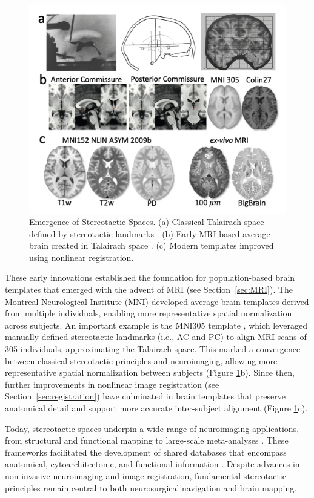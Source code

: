 \begin{figure}[hbt!]
    \centering
    \includegraphics[width=0.85\linewidth]{figs/ch1_Figure_templates.png}
    \caption{Emergence of Stereotactic Spaces. (a) Classical Talairach space defined by stereotactic landmarks \cite{Talairach1957-eb}. (b) Early MRI-based average brain created in Talairach space \cite{Collins1994-dx}. (c) Modern templates \cite{Fonov2011-ck,Edlow2020-mo, Amunts2013-vu} improved using nonlinear registration.}
    \label{fig:ch1_Figure_templates}
\end{figure}

These early innovations established the foundation for population-based brain templates that emerged with the advent of MRI (see Section~\ref{sec:MRI}). The Montreal Neurological Institute (MNI) developed average brain templates derived from multiple individuals, enabling more representative spatial normalization across subjects. An important example is the MNI305 template \cite{Collins1994-ue}, which leveraged manually defined stereotactic landmarks (i.e., AC and PC) to align MRI scans of 305 individuals, approximating the Talairach space. This marked a convergence between classical stereotactic principles and neuroimaging, allowing more representative spatial normalization between subjects (Figure \ref{fig:ch1_Figure_templates}b). Since then, further improvements in nonlinear image registration (see Section~\ref{sec:registration}) have culminated in brain templates \cite{Fonov2009-oi} that preserve anatomical detail and support more accurate inter-subject alignment (Figure \ref{fig:ch1_Figure_templates}c).

Today, stereotactic spaces underpin a wide range of neuroimaging applications, from structural and functional mapping to large-scale meta-analyses \cite{Yarkoni2011-sr,Dockes2020-nw}. These frameworks facilitated the development of shared databases that encompass anatomical, cytoarchitectonic, and functional information \cite{Eickhoff2005-qb}. Despite advances in non-invasive neuroimaging and image registration, fundamental stereotactic principles remain central to both neurosurgical navigation and brain mapping.

